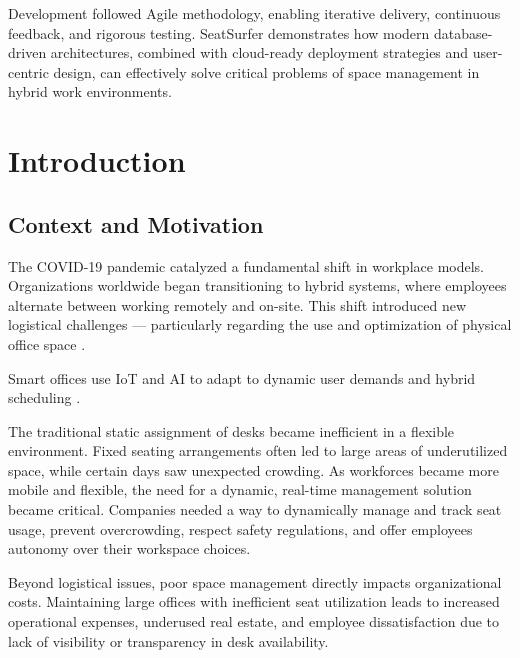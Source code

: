 \documentclass[12pt,a4paper]{report} %
\begin{document}
Development followed Agile methodology, enabling iterative delivery, continuous feedback, and rigorous testing. SeatSurfer demonstrates how modern database-driven architectures, combined with cloud-ready deployment strategies and user-centric design, can effectively solve critical problems of space management in hybrid work environments.

\vspace{0.5cm}

\tableofcontents
\newpage

\chapter{Introduction}

\section{Context and Motivation}

The COVID-19 pandemic catalyzed a fundamental shift in workplace models. Organizations worldwide began transitioning to hybrid systems, where employees alternate between working remotely and on-site. This shift introduced new logistical challenges — particularly regarding the use and optimization of physical office space \cite{baker2021hybrid}.

Smart offices use IoT and AI to adapt to dynamic user demands and hybrid scheduling \cite{nayyar2021smart}.

The traditional static assignment of desks became inefficient in a flexible environment. Fixed seating arrangements often led to large areas of underutilized space, while certain days saw unexpected crowding. As workforces became more mobile and flexible, the need for a dynamic, real-time management solution became critical. Companies needed a way to dynamically manage and track seat usage, prevent overcrowding, respect safety regulations, and offer employees autonomy over their workspace choices.

Beyond logistical issues, poor space management directly impacts organizational costs. Maintaining large offices with inefficient seat utilization leads to increased operational expenses, underused real estate, and employee dissatisfaction due to lack of visibility or transparency in desk availability.
\end{document}
